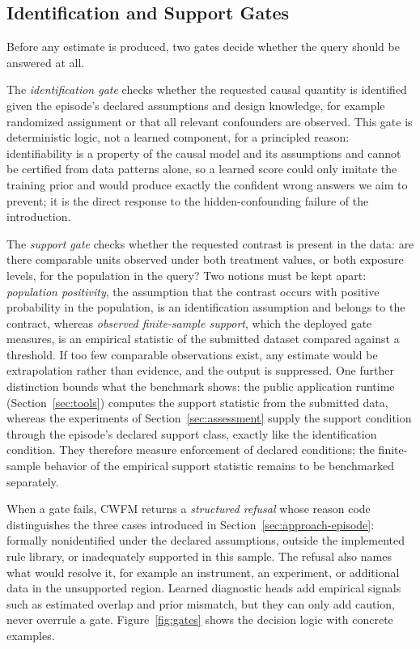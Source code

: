 \documentclass[electronics,article,submit,oneauthor]{Definitions/mdpi}
\begin{document}
\subsection{Identification and Support Gates}\label{sec:approach-gates}

Before any estimate is produced, two gates decide whether the query should be answered at all.

The \emph{identification gate} checks whether the requested causal quantity is identified given the episode's declared assumptions and design knowledge, for example randomized assignment or that all relevant confounders are observed. This gate is deterministic logic, not a learned component, for a principled reason: identifiability is a property of the causal model and its assumptions and cannot be certified from data patterns alone, so a learned score could only imitate the training prior and would produce exactly the confident wrong answers we aim to prevent; it is the direct response to the hidden-confounding failure of the introduction.

The \emph{support gate} checks whether the requested contrast is present in the data: are there comparable units observed under both treatment values, or both exposure levels, for the population in the query? Two notions must be kept apart: \emph{population positivity}, the assumption that the contrast occurs with positive probability in the population, is an identification assumption and belongs to the contract, whereas \emph{observed finite-sample support}, which the deployed gate measures, is an empirical statistic of the submitted dataset compared against a threshold. If too few comparable observations exist, any estimate would be extrapolation rather than evidence, and the output is suppressed. One further distinction bounds what the benchmark shows: the public application runtime (Section~\ref{sec:tools}) computes the support statistic from the submitted data, whereas the experiments of Section~\ref{sec:assessment} supply the support condition through the episode's declared support class, exactly like the identification condition. They therefore measure enforcement of declared conditions; the finite-sample behavior of the empirical support statistic remains to be benchmarked separately.

When a gate fails, CWFM returns a \emph{structured refusal} whose reason code distinguishes the three cases introduced in Section~\ref{sec:approach-episode}: formally nonidentified under the declared assumptions, outside the implemented rule library, or inadequately supported in this sample. The refusal also names what would resolve it, for example an instrument, an experiment, or additional data in the unsupported region. Learned diagnostic heads add empirical signals such as estimated overlap and prior mismatch, but they can only add caution, never overrule a gate. Figure~\ref{fig:gates} shows the decision logic with concrete examples.
\end{document}

